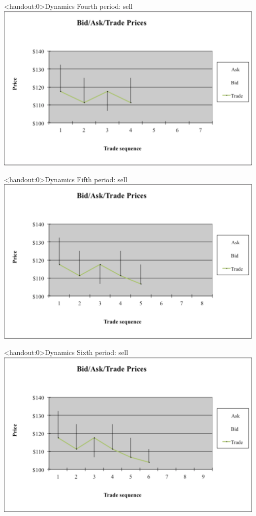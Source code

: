 \documentclass[english,10pt]{beamer}
\begin{document}
\begin{frame}<handout:0>{Dynamics}
	Fourth period: sell
	\center
	\includegraphics[width=0.9\linewidth]{pics/P4_Image.pdf}
\end{frame}


\begin{frame}<handout:0>{Dynamics}
	Fifth period: sell
	\center
	\includegraphics[width=0.9\linewidth]{pics/P5_Image.pdf}
\end{frame}


\begin{frame}<handout:0>{Dynamics}
	Sixth period: sell
	\center
	\includegraphics[width=0.9\linewidth]{pics/P6_Image.pdf}
\end{frame}
\end{document}
